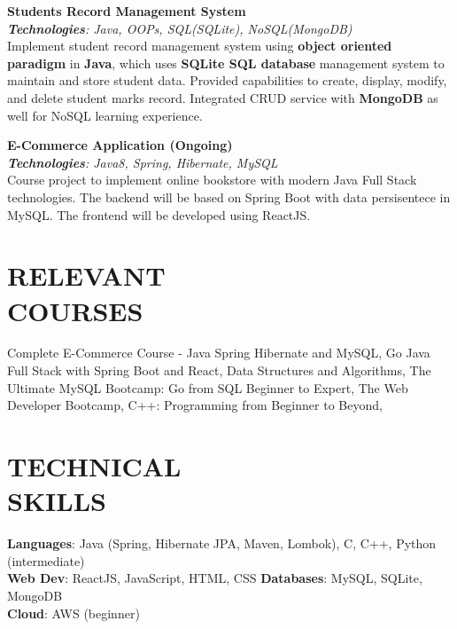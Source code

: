 \documentclass[resmargin]{res}
\begin{document}
\begin{resume}
\textbf{Students Record Management System \href{https://github.com/malavp1998/springboot-with-mongoDB}{\faGitSquare} \href{https://github.com/malavp1998/spring-boot-SqliteDB}{\faGitSquare}} {\sl  \hfill}
\\{\sl \textbf{Technologies}: Java, OOPs, SQL(SQLite), NoSQL(MongoDB)}
\\ Implement student record management system using \textbf{object oriented paradigm} in \textbf{Java}, which uses \textbf{SQLite SQL database} management system to maintain and store student data. Provided capabilities to create, display, modify, and delete student marks record. Integrated CRUD service with \textbf{MongoDB} as well for NoSQL learning experience.

\textbf{E-Commerce Application (Ongoing)} {\sl  \hfill}
\\{\sl \textbf{Technologies}: Java8, Spring, Hibernate, MySQL }
\\ Course project to implement online bookstore with modern Java Full Stack technologies. The backend will be based on Spring Boot with data persisentece in MySQL. The frontend will be developed using ReactJS.


\section{RELEVANT\\ COURSES}
Complete E-Commerce Course - Java Spring Hibernate and MySQL, Go Java Full Stack with Spring Boot and React, Data Structures and Algorithms, The Ultimate MySQL Bootcamp: Go from SQL Beginner to Expert, The Web Developer Bootcamp, C++: Programming from Beginner to Beyond,

\section{TECHNICAL\\SKILLS}

\textbf{Languages}: Java (Spring, Hibernate JPA, Maven, Lombok), C, C++, Python (intermediate) \\
\textbf{Web Dev}: ReactJS, JavaScript, HTML, CSS            \qquad \textbf{Databases}: MySQL, SQLite, MongoDB \\
\textbf{Cloud}: AWS (beginner)





\end{resume}
\end{document}
